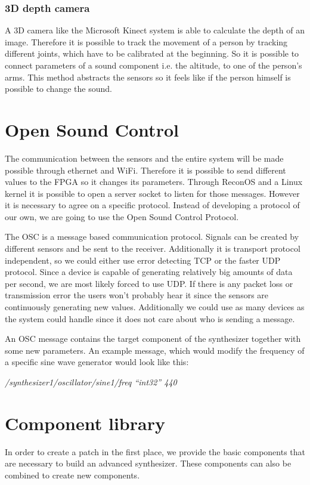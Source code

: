 \subsubsection{3D depth camera}
A 3D camera like the Microsoft Kinect system is able to calculate the depth of an image. 
Therefore it is possible to track the movement of a person by tracking different joints, which have to be calibrated at the beginning. 
So it is possible to connect parameters of a sound component i.e. the altitude, to one of the person's arms. 
This method abstracts the sensors so it feels like if the person himself is possible to change the sound.

\section{Open Sound Control}
The communication between the sensors and the entire system will be made possible through ethernet and WiFi. 
Therefore it is possible to send different values to the \ac{FPGA} so it changes its parameters. 
Through ReconOS and a Linux kernel it is possible to open a server socket to listen for those messages. 
However it is necessary to agree on a specific protocol. Instead of developing a protocol of our own, we are going to use the Open Sound Control Protocol.

The \ac{OSC} is a message based communication protocol. 
Signals can be created by different sensors and be sent to the receiver. 
Additionally it is transport protocol independent, so we could either use error detecting TCP or the faster UDP protocol. 
Since a device is capable of generating relatively big amounts of data per second, we are most likely forced to use UDP. 
If there is any packet loss or transmission error the users won't probably hear it since the sensors are continuously generating new values. 
Additionally we could use as many devices as the system could handle since it does not care about who is sending a message.

An \ac{OSC} message contains the target component of the synthesizer together with some new parameters. 
An example message, which would modify the frequency of a specific sine wave generator would look like this: 

\emph{/synthesizer1/oscillator/sine1/freq “int32” 440} \\


\section{Component library}
In order to create a patch in the first place, we provide the basic components that are necessary to build an advanced synthesizer. 
These components can also be combined to create new components.


